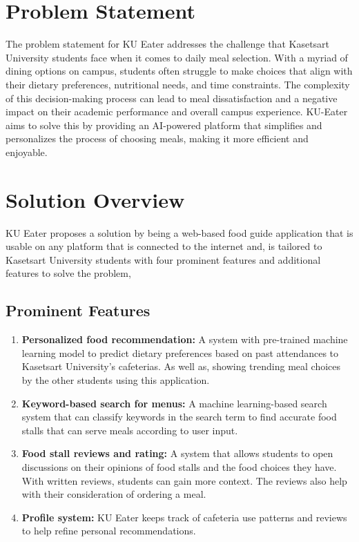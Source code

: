 \section{Problem Statement}
\label{section:problem-statement}

The problem statement for KU Eater addresses the challenge that Kasetsart University students face
when it comes to daily meal selection. With a myriad of dining options on campus, students often struggle to make choices
that align with their dietary preferences, nutritional needs, and time constraints. The complexity of this decision-making
process can lead to meal dissatisfaction and a negative impact on their academic performance and overall campus experience.
KU-Eater aims to solve this by providing an AI-powered platform that simplifies and personalizes the process of choosing meals,
making it more efficient and enjoyable.

\section{Solution Overview}
\label{section:solution-overview}

KU Eater proposes a solution by being a web-based food guide application that is usable on any platform that is connected to the internet and,
is tailored to Kasetsart University students with four prominent features and additional features to solve the problem,

\subsection{Prominent Features}
\label{subsection:main-features}

\begin{enumerate}[leftmargin=80pt]
    \item \textbf{Personalized food recommendation:} A system with pre-trained machine learning model to predict dietary preferences based on past attendances to Kasetsart University's cafeterias. As well as, showing trending meal choices by the other students using this application.
    \item \textbf{Keyword-based search for menus:} A machine learning-based search system that can classify keywords in the search term to find accurate food stalls that can serve meals according to user input.
    \item \textbf{Food stall reviews and rating:} A system that allows students to open discussions on their opinions of food stalls and the food choices they have. With written reviews, students can gain more context. The reviews also help with their consideration of ordering a meal.
    \item \textbf{Profile system:} KU Eater keeps track of cafeteria use patterns and reviews to help refine personal recommendations.
\end{enumerate}


